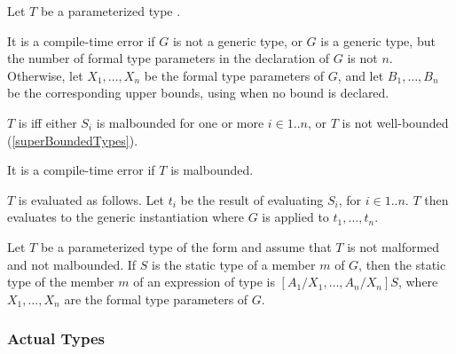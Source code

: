 \documentclass[makeidx]{article}
\begin{document}
{

\LMHash{}%
Let $T$ be a parameterized type .

\LMHash{}%
It is a compile-time error if $G$ is not a generic type,
or $G$ is a generic type,
but the number of formal type parameters in the declaration of $G$ is not $n$.
Otherwise, let
$X_1, \ldots, X_n$
be the formal type parameters of $G$, and let
$B_1, \ldots, B_n$
be the corresponding upper bounds, using \DYNAMIC{} when no bound is declared.

\LMHash{}%
$T$ is  if{}f either
$S_i$ is malbounded for one or more $i \in 1 .. n$,
or $T$ is not well-bounded (\ref{superBoundedTypes}).

\LMHash{}%
It is a compile-time error if $T$ is malbounded.

\LMHash{}%
$T$ is evaluated as follows.
Let $t_i$ be the result of evaluating $S_i$, for $i \in 1 .. n$.
$T$ then evaluates to the generic instantiation
where $G$ is applied to $t_1, \ldots, t_n$.

\LMHash{}%
Let $T$ be a parameterized type of the form
and assume that $T$ is not malformed and not malbounded.
If $S$ is the static type of a member $m$ of $G$,
then the static type of the member $m$ of an expression of type
is
$[A_1/X_1, \ldots, A_n/X_n]S$,
where $X_1, \ldots, X_n$ are the formal type parameters of $G$.



\subsubsection{Actual Types}

%

}
\end{document}
